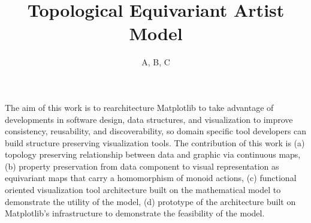 \documentclass[journal]{vgtc}                %
\title{Topological Equivariant Artist Model}
\author{A, B, C}
\begin{document}

\maketitle
The aim of this work is to rearchitecture Matplotlib to take advantage of developments in software design, data structures, and visualization to improve consistency, reusability, and discoverability, so domain specific tool developers can build structure preserving visualization tools. The contribution of this work is (a) topology preserving relationship between data and graphic via continuous maps, (b) property preservation from data component to visual representation as equivariant maps that carry a homomorphism of monoid actions, (c) functional oriented visualization tool architecture built on the mathematical model to demonstrate the utility of the model, (d) prototype of the architecture built on Matplotlib's infrastructure to demonstrate the feasibility of the model.
\end{document}
